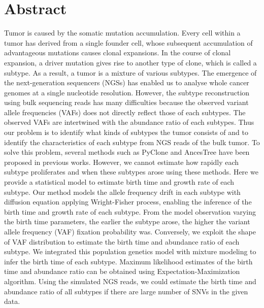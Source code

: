 \documentclass{article}
\begin{document}
\section*{Abstract}
Tumor is caused by the somatic mutation accumulation. Every cell within a tumor has derived from a single founder cell, whose subsequent accumulation of advantageous mutations causes clonal expansions. In the course of clonal expansion, a driver mutation gives rise to another type of clone, which is called a subtype. As a result, a tumor is a mixture of various subtypes.
The emergence of the next-generation sequencers (NGSs) has enabled us to analyse whole cancer genomes at a single nucleotide resolution. However, the subtype reconstruction using bulk sequencing reads has many difficulties because the observed variant allele frequencies (VAFs) does not directly reflect those of each subtypes.
The observed VAFs are intertwined with the abundance ratio of each subtypes.
 Thus our problem is to identify what kinds of subtypes the tumor consists of and to identify the characteristics of each subtype from NGS reads of the bulk tumor. To solve this problem, several methods such as PyClone and AncesTree have been proposed in previous works. However, we cannot estimate how rapidly each subtype proliferates and when these subtypes arose using these methods. Here we provide a statistical model to estimate birth time and growth rate of each subtype.
 Our method models the allele frequency drift in each subtype with diffusion equation applying Wright-Fisher process, enabling the inference of the birth time and growth rate of each subtype.
 From the model observation varying the birth time parameters, the earlier the subtype arose, the higher the variant allele frequency (VAF) fixation probability was.
 Conversely, we exploit the shape of VAF distribution to estimate the birth time and abundance ratio of each subtype.
 We integrated this population genetics model with mixture modeling to infer the birth time of each subtype. Maximum likelihood estimates of the birth time and abundance ratio can be obtained using Expectation-Maximization algorithm.
Using the simulated NGS reads, we could estimate the birth time and abundance ratio of all subtypes if there are large number of SNVs in the given data.
\end{document}
